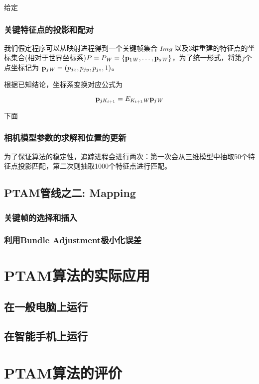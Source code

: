 给定 

\subsubsection{关键特征点的投影和配对}

我们假定程序可以从映射进程得到一个关键帧集合 $Img$ 以及3维重建的特征点的坐标集合(相对于世界坐标系)$P=P_{\mathit{W}}=\{\mathbf{p}_{1\mathit{W}},\ldots,\mathbf{p}_{s\mathit{W}}\}$，为了统一形式，将第$j$个点坐标记为 $\mathbf{p}_{j\mathit{W}}= (p_{jx},p_{jy},p_{jz},1)$。

根据已知结论，坐标系变换对应公式为

\begin{equation}
\mathbf{p}_{jK_{t+1}}= E_{K_{t+1}\mathit{W}} \mathbf{p}_{j\mathit{W}}
\end{equation}

下面





\subsubsection{相机模型参数的求解和位置的更新}


为了保证算法的稳定性，追踪进程会进行两次：第一次会从三维模型中抽取50个特征点投影匹配，第二次则抽取1000个特征点进行匹配。


\subsection{PTAM管线之二: Mapping}

\subsubsection{关键帧的选择和插入}

\subsubsection{利用Bundle Adjustment极小化误差}


\section{PTAM算法的实际应用}
\subsection{在一般电脑上运行}
\subsection{在智能手机上运行}

\section{PTAM算法的评价}
